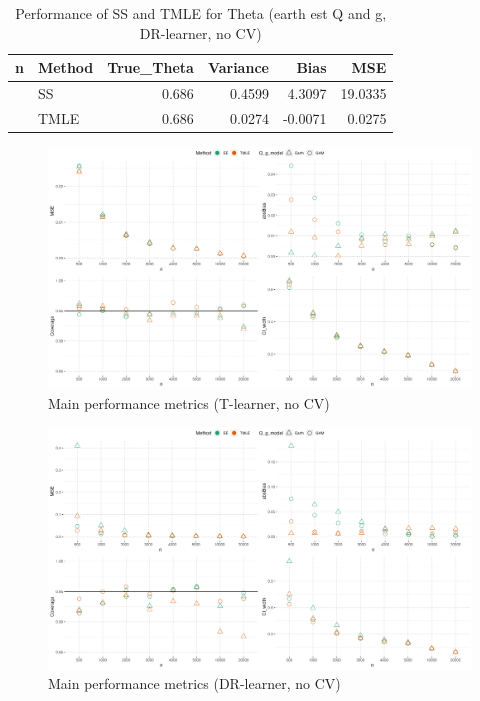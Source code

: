\documentclass[
]{article}
\begin{document}
\begin{table}

\caption{\label{tab:unnamed-chunk-14}Performance of SS and TMLE for Theta (earth est Q and g, DR-learner, no CV)}
\centering
\fontsize{9}{11}\selectfont
\begin{tabular}[t]{rlrrrr}
\toprule
n & Method & True\_Theta & Variance & Bias & MSE\\
\midrule
 & SS & 0.686 & 0.4599 & 4.3097 & 19.0335\\

\multirow{-2}{*}{\raggedleft\arraybackslash 1000} & TMLE & 0.686 & 0.0274 & -0.0071 & 0.0275\\
\bottomrule
\end{tabular}
\end{table}

\clearpage

\begin{figure}[H]

{\centering \includegraphics[width=1\linewidth]{plot_dots_t_nocv_v} 

}

\caption{Main performance metrics (T-learner, no CV)}\label{fig:unnamed-chunk-15}
\end{figure}

\begin{figure}[H]

{\centering \includegraphics[width=1\linewidth]{plot_dots_dr_nocv_v} 

}

\caption{Main performance metrics (DR-learner, no CV)}\label{fig:unnamed-chunk-16}
\end{figure}
\end{document}
